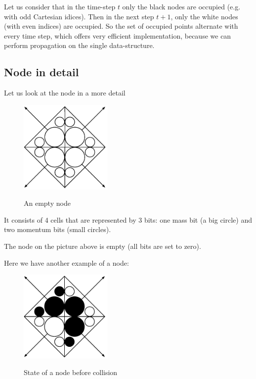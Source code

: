 Let us consider that in the time-step $t$ only the black nodes are occupied (e.g. with odd Cartesian idices). Then in the next step $t+1$, only the white nodes (with even indices) are occupied. 
So the set of occupied points alternate with every time step, which offers very efficient implementation, because we can perform propagation on the single data-structure.

\bigskip

\subsection{Node in detail}

Let us look at the node in a more detail
\begin{figure}[H]
 \centering 
 \includegraphics[width=0.4\textwidth]{./img/emptynode}
 \label{empty}
 \caption{An empty node}
\end{figure}

\newpage
It consists of 4 cells that are represented by 3 bits:
one mass bit (a big circle) and two momentum bits (small circles).

The node on the picture above is empty (all bits are set to zero).

Here we have another example of a node:
\begin{figure}[htbp]
 \centering 
 \includegraphics[width=0.4\textwidth]{./img/beforeX}
 \label{pre_collision}
 \caption{State of a node before collision}
\end{figure}

